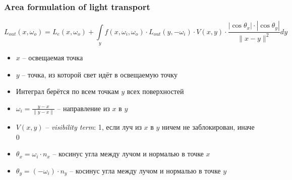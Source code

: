 \documentclass[10pt]{beamer}
\begin{document}
\begin{frame}
\frametitle{Area formulation of light transport}
\begin{equation*}
L_{out}(x, \omega_o) = L_e(x, \omega_o) + \int\limits_y f(x,\omega_i,\omega_o) \cdot L_{out}(y, -\omega_i) \cdot V(x,y)\cdot \frac{|\cos \theta_x| \cdot |\cos \theta_y|}{\|x-y\|^2} dy
\end{equation*}
\pause
\begin{itemize}
\item \begin{math}x\end{math} -- освещаемая точка
\pause
\item \begin{math}y\end{math} -- точка, из которой свет идёт в освещаемую точку
\pause
\item Интеграл берётся по всем точкам \(y\) всех поверхностей
\pause
\item \begin{math}\omega_i = \frac{y-x}{\|y-x\|}\end{math} -- направление из \begin{math}x\end{math} в \begin{math}y\end{math}
\pause
\item \begin{math}V(x,y)\end{math} -- \textit{visibility term}: 1, если луч из \begin{math}x\end{math} в \begin{math}y\end{math} ничем не заблокирован, иначе 0
\pause
\item \begin{math}\theta_x = \omega_i \cdot n_x\end{math} -- косинус угла между лучом и нормалью в точке \begin{math}x\end{math}
\pause
\item \begin{math}\theta_y = (-\omega_i) \cdot n_y\end{math} -- косинус угла между лучом и нормалью в точке \begin{math}y\end{math}
\end{itemize}
\end{frame}
\end{document}
